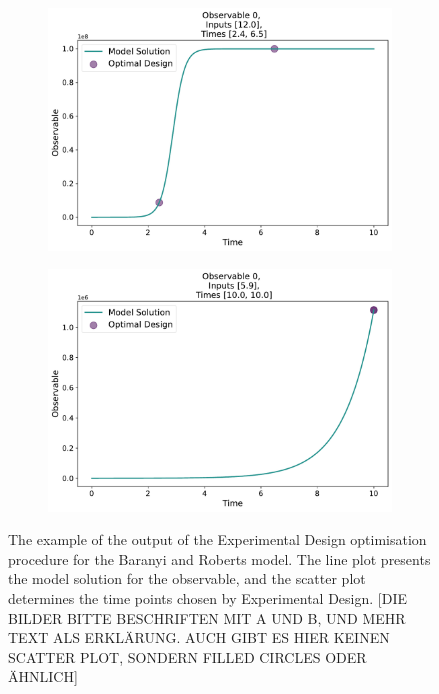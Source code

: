 \documentclass[10pt,A4paper]{article}
\begin{document}
\begin{figure}[H]
    \begin{subfigure}{.5\textwidth}
        \centering
        \includegraphics[scale=0.27]{Figures/Observable_Results_baranyi_roberts_ode_fisher_determinant_rel_sensit_cont_2times_2temps_000_x_00.pdf}
        \subcaption{}
    \end{subfigure}    
    \begin{subfigure}{.5\textwidth}
        \centering
        \includegraphics[scale=0.27]{Figures/Observable_Results_baranyi_roberts_ode_fisher_determinant_rel_sensit_cont_2times_2temps_001_x_00.pdf}
        \subcaption{}
    \end{subfigure}
    \caption{{\footnotesize The example of the output of the Experimental Design optimisation procedure for the Baranyi and Roberts model. 
    The line plot presents the model solution for the observable, and the scatter plot determines the time points chosen by Experimental Design. [DIE BILDER BITTE BESCHRIFTEN MIT A UND B, UND MEHR TEXT ALS ERKLÄRUNG. AUCH GIBT ES HIER KEINEN SCATTER PLOT, SONDERN FILLED CIRCLES ODER ÄHNLICH]}}
    \label{fig:baranyi_roberts_observable}
\end{figure}
\end{document}
